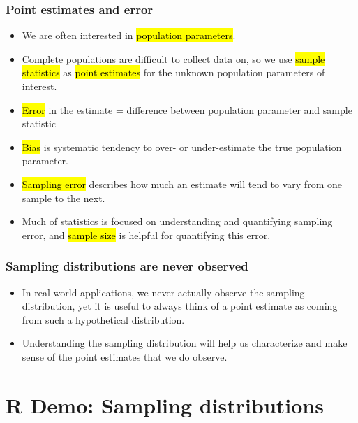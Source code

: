 \documentclass[t,compress,mathserif]{beamer}
\begin{document}
\begin{frame}
    \frametitle{Point estimates and error}

    \begin{itemize}

        \item We are often interested in \hl{population parameters}.
        \item Complete populations are difficult to collect data on, so we use \hl{sample statistics} as \hl{point estimates} for the unknown population parameters of interest.
        \item \hl{Error} in the estimate = difference between population parameter and sample statistic
        \item \hl{Bias} is systematic tendency to over- or under-estimate the true population parameter.
        \item \hl{Sampling error} describes how much an estimate will tend to vary from one sample to the next.
        \item Much of statistics is focused on understanding and quantifying sampling error, and \hl{sample size} is helpful for quantifying this error.

    \end{itemize}

\end{frame}


\begin{frame}
    \frametitle{Sampling distributions are never observed}

    \begin{itemize}

        \item In real-world applications, we never actually observe the sampling distribution, yet it is useful to always think of a point estimate as coming from such a hypothetical distribution.
        \item Understanding the sampling distribution will help us characterize and make sense of the point estimates that we do observe.

    \end{itemize}

\end{frame}


\section{R Demo: Sampling distributions}
\end{document}
